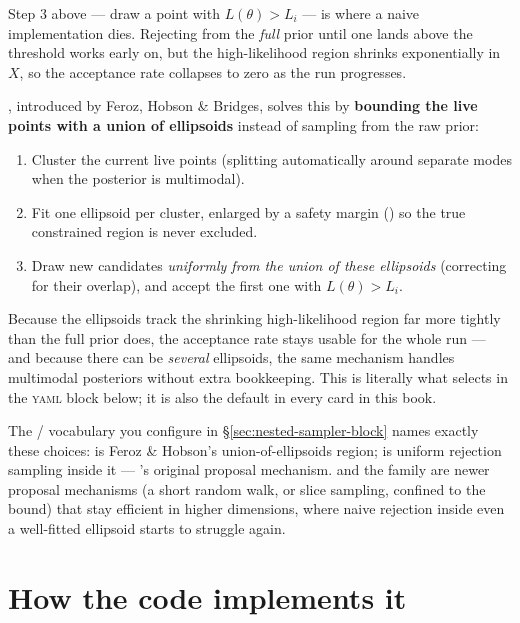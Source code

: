 Step 3 above --- draw a point with $L(\theta) > L_i$ --- is where a naive
implementation dies. Rejecting from the \emph{full} prior until one lands above the
threshold works early on, but the high-likelihood region shrinks exponentially in
$X$, so the acceptance rate collapses to zero as the run progresses.

, introduced by Feroz, Hobson \& Bridges\cite{Feroz:2008xx}, solves
this by \textbf{bounding the live points with a union of ellipsoids} instead of
sampling from the raw prior:

\begin{enumerate}
  \item Cluster the current live points (splitting automatically around separate
        modes when the posterior is multimodal).
  \item Fit one ellipsoid per cluster, enlarged by a safety margin
        () so the true constrained region is never excluded.
  \item Draw new candidates \emph{uniformly from the union of these ellipsoids}
        (correcting for their overlap), and accept the first one with
        $L(\theta) > L_i$.
\end{enumerate}

Because the ellipsoids track the shrinking high-likelihood region far more tightly
than the full prior does, the acceptance rate stays usable for the whole run --- and
because there can be \emph{several} ellipsoids, the same mechanism handles multimodal
posteriors without extra bookkeeping. This is literally what 
selects in the \textsc{yaml} block below; it is also the default in every card in this
book.

\begin{jnote}
The / vocabulary you configure in
\S\ref{sec:nested-sampler-block} names exactly these choices: 
is Feroz \& Hobson's union-of-ellipsoids region;  is uniform
rejection sampling inside it --- 's original proposal mechanism.
 and the  family are newer proposal mechanisms
(a short random walk, or slice sampling, confined to the bound) that stay efficient in
higher dimensions, where naive rejection inside even a well-fitted ellipsoid starts to
struggle again.
\end{jnote}

\section{How the code implements it}
\label{sec:multinest-code}

